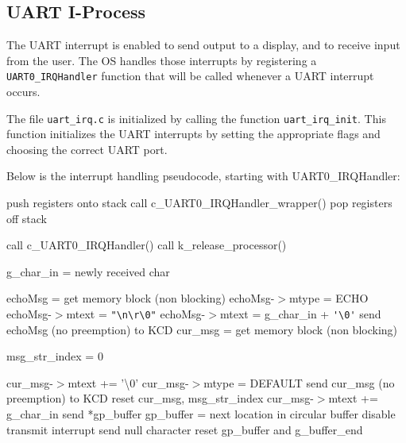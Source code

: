 \documentclass[12pt]{report}
\begin{document}
\subsection{UART I-Process}

The UART interrupt is enabled to send output to a display, and to receive input from the user. The OS handles those interrupts by registering a \texttt{UART0_IRQHandler} function that will be called whenever a UART interrupt occurs.

The file \texttt{uart_irq.c} is initialized by calling the function \texttt{uart_irq_init}. This function initializes the UART interrupts by setting the appropriate flags and choosing the correct UART port.

Below is the interrupt handling pseudocode, starting with UART0_IRQHandler:
\begin{algorithmic}[1]
    \State push registers onto stack
    \State call c_UART0_IRQHandler_wrapper()
    \State pop registers off stack
  \EndFunction
\end{algorithmic}
\begin{algorithmic}[1]
    \State call c_UART0_IRQHandler()
      \State call k_release_processor()
    \EndIf
  \EndFunction
\end{algorithmic}
\begin{algorithmic}[1]
      \State g_char_in = newly received char
        \State\Return
      \EndIf

      \State echoMsg = get memory block (non blocking)
        \State echoMsg-$>$mtype = ECHO
          \State echoMsg-$>$mtext = \verb|"\n\r\0"|
        \Else
          \State echoMsg-$>$mtext = g_char_in + \verb|'\0'|
        \EndIf
        \State send echoMsg (no preemption) to KCD
      \EndIf
        \State cur_msg = get memory block (non blocking)
          \State\Return
        \EndIf

        \State msg_str_index = 0
      \EndIf

        \State cur_msg-$>$mtext += '\textbackslash 0'
        \State cur_msg-$>$mtype = DEFAULT
        \State send cur_msg (no preemption) to KCD
        \State reset cur_msg, msg_str_index
      \Else
        \State cur_msg-$>$mtext += g_char_in
      \EndIf
        \State send *gp_buffer
        \State gp_buffer = next location in circular buffer
      \Else
        \State disable transmit interrupt
        \State send null character
        \State reset gp_buffer and g_buffer_end
      \EndIf
    \EndIf
  \EndFunction
\end{algorithmic}
\end{document}
